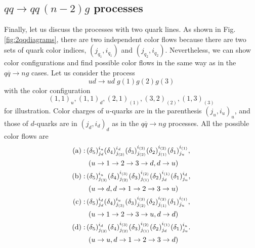 \documentclass[a4paper,11pt]{article}
\begin{document}
\subsection{$qq\rightarrow qq\,(n-2)g$ processes}
Finally, let us discuss the processes with two quark lines. As shown in
Fig.\,\ref{fig:2qqdiagrams}, there are two independent color flows because there are two sets of quark color
indices, $(j_{q_1}, i_{q_1})$ and $(j_{q_2}, i_{q_2})$. Nevertheless, we
can show color configurations and find possible color flows in the same
way as in the $q\overline{q}\rightarrow ng$ cases. Let us consider the process
\begin{equation}
 u d\rightarrow u d \;g(1) g(2) g(3)
\end{equation}
with the color configuration
\begin{equation}
  (1,1)_u,(1,1)_d,(2,1)_{(1)},(3,2)_{(2)},(1,3)_{(3)}
\end{equation}
for illustration. Color charges of $u$-quarks are in the parenthesis
$(j_u,i_u)_u$, and those of $d$-quarks are in $(j_d,i_d)_d$ as in
the $q\overline{q}\rightarrow ng$ processes. All the possible color
flows are
\begin{subequations}
\begin{align}
 {\rm (a)}:\,&(\delta_5)^{i_u}_{j_d}(\delta_4)^{i_d}_{j_{(3)}}(\delta_3)^{i_{(3)}}_{j_{(2)}}(\delta_2)^{i_{(2)}}_{j_{(1)}}(\delta_1)^{i_{(1)}}_{j_u},\\
 &\;(u\rightarrow 1\rightarrow 2\rightarrow 3\rightarrow d, d\rightarrow u)\nonumber\\
 {\rm (b)}:\,&(\delta_5)^{i_u}_{j_{(3)}}(\delta_4)^{i_{(3)}}_{j_{(2)}}(\delta_3)^{i_{(2)}}_{j_{(1)}}(\delta_2)^{i_{(1)}}_{j_d}(\delta_1)^{i_d}_{j_u},\\
 &\;(u\rightarrow d, d\rightarrow 1\rightarrow 2\rightarrow
 3\rightarrow u)\nonumber\\
 {\rm (c)}:\,&(\delta_5)^{i_d}_{j_d}(\delta_4)^{i_u}_{j_{(3)}}(\delta_3)^{i_{(3)}}_{j_{(2)}}(\delta_2)^{i_{(2)}}_{j_{(1)}}(\delta_1)^{i_{(1)}}_{j_u},\\
 &\;(u\rightarrow 1\rightarrow 2\rightarrow 3\rightarrow u, d\rightarrow d)\nonumber\\
 {\rm (d)}:\,&(\delta_5)^{i_d}_{j_{(3)}}(\delta_4)^{i_{(3)}}_{j_{(2)}}(\delta_3)^{i_{(2)}}_{j_{(1)}}(\delta_2)^{i_{(1)}}_{j_d}(\delta_1)^{i_u}_{j_u}.\\
 &\;(u\rightarrow u, d\rightarrow 1\rightarrow 2\rightarrow
 3\rightarrow d)\nonumber
\end{align}
\end{subequations}
\end{document}
